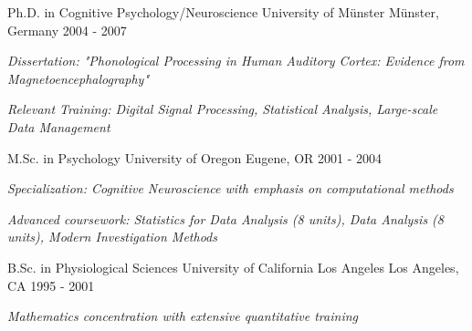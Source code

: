 

\begin{cventries}

    \cventry
      {Ph.D. in Cognitive Psychology/Neuroscience} %
      {University of Münster} %
      {Münster, Germany} %
      {2004 - 2007} %
      {
        \begin{cvitems} %
          \item {\textit{Dissertation: "Phonological Processing in Human Auditory Cortex: Evidence from Magnetoencephalography"}}
          \item {\textit{Relevant Training: Digital Signal Processing, Statistical Analysis, Large-scale Data Management}}
        \end{cvitems}
      }

    \cventry
      {M.Sc. in Psychology} %
      {University of Oregon} %
      {Eugene, OR} %
      {2001 - 2004} %
      {
        \begin{cvitems} %
          \item {\textit{Specialization: Cognitive Neuroscience with emphasis on computational methods}}
          \item {\textit{Advanced coursework: Statistics for Data Analysis (8 units), Data Analysis (8 units), Modern Investigation Methods}}
        \end{cvitems}
      }

    \cventry
      {B.Sc. in Physiological Sciences} %
      {University of California Los Angeles} %
      {Los Angeles, CA} %
      {1995 - 2001} %
      {
        \begin{cvitems} %
          \item {\textit{Mathematics concentration with extensive quantitative training}}
        \end{cvitems}
      }
  \end{cventries}
